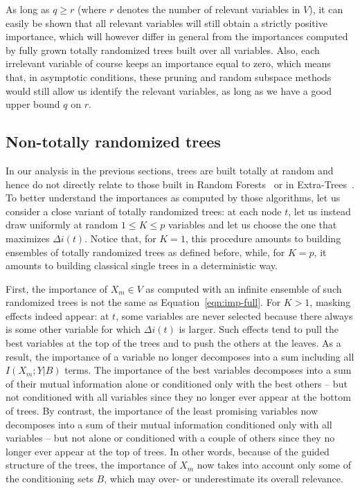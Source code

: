 \documentclass{article}
\begin{document}
As long as $q  \geq r $ (where $r$ denotes the number of relevant variables in $V$), it can easily be shown that all relevant variables
will still obtain a strictly positive importance, which will however differ in
general from the importances computed by fully grown totally randomized trees
built over all variables.  Also, each irrelevant variable of course keeps an
importance equal to zero, which means that, in asymptotic conditions, these
pruning and random subspace methods would still allow us identify the relevant  variables, as long as we
have a good upper bound $q$ on $r$.




\subsection{Non-totally randomized trees}
\label{sec:ntrt}

In our analysis in the previous sections, trees are built totally at random and hence do not directly relate
to those built in Random Forests~\citep{breiman2001rf} or in Extra-Trees~\citep{geurts2006et}. To better understand the importances as
computed by those algorithms,  let us consider a close variant of totally
randomized trees: at each node $t$, let us instead draw uniformly at random $1
\leq K \leq p$ variables  and let us choose the one that maximizes $\Delta i(t)$.
Notice that, for $K=1$, this
procedure amounts to building ensembles of  totally randomized trees as defined before, while,
for $K=p$, it amounts to building classical single trees in a deterministic way.

First, the importance of  $X_m \in V$ as computed with an infinite ensemble of
such randomized trees is not the same as Equation~\ref{eqn:imp-full}. For $K>1$,
masking effects indeed appear: at $t$, some variables are never selected
because there always is some other variable for which $\Delta i(t)$ is larger.
Such effects tend to pull the best variables  at the top of the trees and to
push the others at the leaves.  As a result, the importance of a variable no
longer decomposes into a sum including all $I(X_m;Y|B)$ terms. The
importance of the best variables decomposes into a sum of their mutual
information alone or conditioned only with the best others -- but not
conditioned with all variables since they no longer ever appear at the bottom of
trees. By contrast, the importance of the least promising variables now
decomposes into a sum of their mutual information conditioned only with all
variables -- but not alone or conditioned with a couple of others since they no
longer ever appear at the top of trees. In other words, because of the guided
structure of the trees, the importance of $X_m$ now takes into account only some
of the conditioning sets $B$, which may over- or underestimate its overall
relevance.
\end{document}
